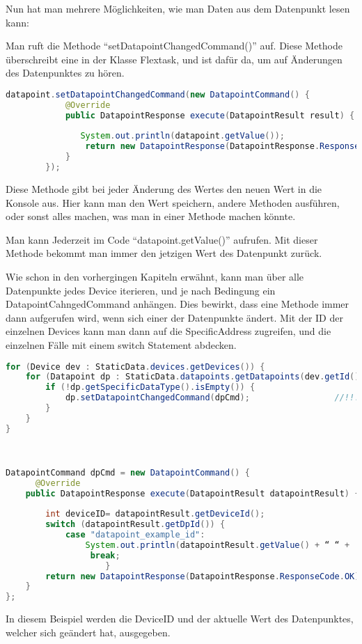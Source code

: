Nun hat man mehrere Möglichkeiten, wie man Daten aus dem Datenpunkt lesen kann: 
\begin{compactenum}
    \item Man ruft die Methode “setDatapointChangedCommand()” auf. Diese Methode überschreibt eine in der Klasse Flextask, und ist dafür da, um auf Änderungen des Datenpunktes zu hören. 
    \begin{lstlisting}[language=java,caption=Example catapoint usage,label=lst:impl:foo]
        datapoint.setDatapointChangedCommand(new DatapointCommand() { 
            @Override 
            public DatapointResponse execute(DatapointResult result) { 
         
               System.out.println(datapoint.getValue()); 
                return new DatapointResponse(DatapointResponse.ResponseCode.OK); 
            } 
        }); 
    \end{lstlisting}
    Diese Methode gibt bei jeder Änderung des Wertes den neuen Wert in die Konsole aus. Hier kann man den Wert speichern, andere Methoden ausführen, oder sonst alles machen, was man in einer Methode machen könnte.  

    \item Man kann Jederzeit im Code “datapoint.getValue()” aufrufen. Mit dieser Methode bekommt man immer den jetzigen Wert des Datenpunkt zurück.  
    \item Wie schon in den vorhergingen Kapiteln erwähnt, kann man über alle Datenpunkte jedes Device iterieren, und je nach Bedingung ein DatapointCahngedCommand anhängen. Dies bewirkt, dass eine Methode immer dann aufgerufen wird, wenn sich einer der Datenpunkte ändert. Mit der ID der einzelnen Devices kann man dann auf die SpecificAddress zugreifen, und die einzelnen Fälle mit einem switch Statement abdecken. 
    \begin{lstlisting}[language=java,caption=Example multible datapoint usage,label=lst:impl:foo]
        for (Device dev : StaticData.devices.getDevices()) { 
    for (Datapoint dp : StaticData.datapoints.getDatapoints(dev.getId())) { 
        if (!dp.getSpecificDataType().isEmpty()) { 
            dp.setDatapointChangedCommand(dpCmd);                 //!!! 
        } 
    } 
} 

 

DatapointCommand dpCmd = new DatapointCommand() { 
      @Override 
    public DatapointResponse execute(DatapointResult datapointResult) { 
 
        int deviceID= datapointResult.getDeviceId();  
        switch (datapointResult.getDpId()) { 
            case "datapoint_example_id": 
                System.out.println(datapointResult.getValue() + “ “ +		          deviceID ); 
                 break; 
                    } 
        return new DatapointResponse(DatapointResponse.ResponseCode.OK); 
    } 
}; 

    \end{lstlisting}
    In diesem Beispiel werden die DeviceID und der aktuelle Wert des Datenpunktes, welcher sich geändert hat, ausgegeben.
\end{compactenum}

